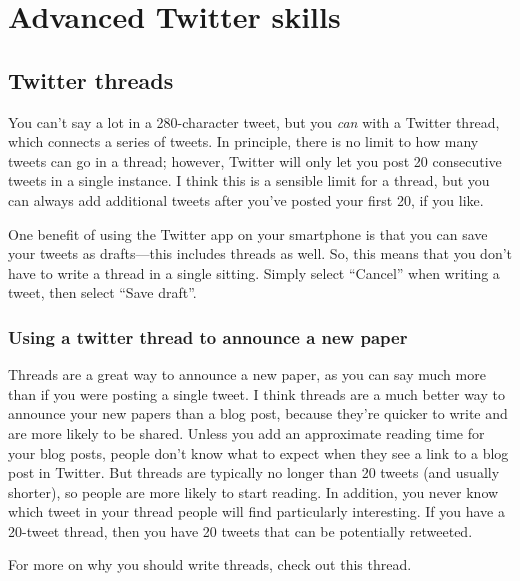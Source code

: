 \documentclass[
]{book}
\begin{document}
\hypertarget{advanced}{%
\chapter{Advanced Twitter skills}\label{advanced}}

\hypertarget{twitter-threads}{%
\section*{Twitter threads}\label{twitter-threads}}

You can't say a lot in a 280-character tweet, but you \emph{can} with a Twitter thread, which connects a series of tweets. In principle, there is no limit to how many tweets can go in a thread; however, Twitter will only let you post 20 consecutive tweets in a single instance. I think this is a sensible limit for a thread, but you can always add additional tweets after you've posted your first 20, if you like.

One benefit of using the Twitter app on your smartphone is that you can save your tweets as drafts---this includes threads as well. So, this means that you don't have to write a thread in a single sitting. Simply select ``Cancel'' when writing a tweet, then select ``Save draft''.

\hypertarget{using-a-twitter-thread-to-announce-a-new-paper}{%
\subsection{Using a twitter thread to announce a new paper}\label{using-a-twitter-thread-to-announce-a-new-paper}}

Threads are a great way to announce a new paper, as you can say much more than if you were posting a single tweet. I think threads are a much better way to announce your new papers than a blog post, because they're quicker to write and are more likely to be shared. Unless you add an approximate reading time for your blog posts, people don't know what to expect when they see a link to a blog post in Twitter. But threads are typically no longer than 20 tweets (and usually shorter), so people are more likely to start reading. In addition, you never know which tweet in your thread people will find particularly interesting. If you have a 20-tweet thread, then you have 20 tweets that can be potentially retweeted.

For more on why you should write threads, check out this thread.
\end{document}
